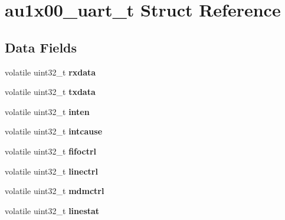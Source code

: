 \hypertarget{structau1x00__uart__t}{}\section{au1x00\+\_\+uart\+\_\+t Struct Reference}
\label{structau1x00__uart__t}
\subsection*{Data Fields}
\begin{DoxyCompactItemize}
\item 
\mbox{\label{structau1x00__uart__t_a9352ab5b95e7ffb81eda04cafd3d8d8c}} 
volatile uint32\+\_\+t {\bfseries rxdata}
\item 
\mbox{\label{structau1x00__uart__t_ae78ab5d3e512e429f0db4fc779860810}} 
volatile uint32\+\_\+t {\bfseries txdata}
\item 
\mbox{\label{structau1x00__uart__t_aaca3d497fd0d5cdd7b886102c29d9932}} 
volatile uint32\+\_\+t {\bfseries inten}
\item 
\mbox{\label{structau1x00__uart__t_aeb5073b89b7dfdabc55f201feb3bd039}} 
volatile uint32\+\_\+t {\bfseries intcause}
\item 
\mbox{\label{structau1x00__uart__t_ac670d52f3aa4a1b45e9dc29eccb8e4ce}} 
volatile uint32\+\_\+t {\bfseries fifoctrl}
\item 
\mbox{\label{structau1x00__uart__t_a13c11b8eeb11ff90713ca4fdbd36b7ee}} 
volatile uint32\+\_\+t {\bfseries linectrl}
\item 
\mbox{\label{structau1x00__uart__t_a88819d5a28bbd64a920b03e1b1d4d280}} 
volatile uint32\+\_\+t {\bfseries mdmctrl}
\item 
\mbox{\label{structau1x00__uart__t_aca20f3439e7b7389d43cfbdd098c9c62}} 
volatile uint32\+\_\+t {\bfseries linestat}
\item 
\mbox{\label{structau1x00__uart__t_acae9af2e112beb87e9660151cd4279ff}} 

\end{DoxyCompactItemize}
